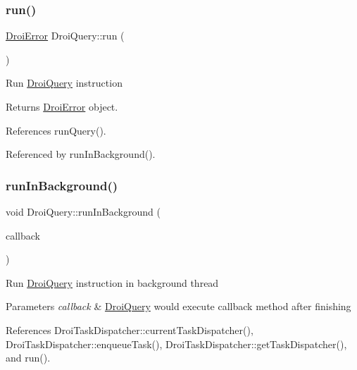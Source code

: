 \subsubsection{\texorpdfstring{run()}{run()}}
{\footnotesize\ttfamily \hyperlink{class_droi_error}{Droi\+Error} Droi\+Query\+::run (\begin{DoxyParamCaption}{ }\end{DoxyParamCaption})}

Run \hyperlink{class_droi_query}{Droi\+Query} instruction \begin{DoxyReturn}{Returns}
\hyperlink{class_droi_error}{Droi\+Error} object. 
\end{DoxyReturn}


References run\+Query().



Referenced by run\+In\+Background().

\mbox{\label{class_droi_query_a853e3dc36ab0918847a5279b0989c7ab}} 
\subsubsection{\texorpdfstring{run\+In\+Background()}{runInBackground()}}
{\footnotesize\ttfamily void Droi\+Query\+::run\+In\+Background (\begin{DoxyParamCaption}\item[{\hyperlink{struct_droi_callback}{Droi\+Callback}$<$ \hyperlink{class_droi_error}{Droi\+Error} $>$\+::on\+Callback}]{callback }\end{DoxyParamCaption})}

Run \hyperlink{class_droi_query}{Droi\+Query} instruction in background thread 
\begin{DoxyParams}{Parameters}
{\em callback} & \hyperlink{class_droi_query}{Droi\+Query} would execute callback method after finishing \\
\hline
\end{DoxyParams}


References Droi\+Task\+Dispatcher\+::current\+Task\+Dispatcher(), Droi\+Task\+Dispatcher\+::enqueue\+Task(), Droi\+Task\+Dispatcher\+::get\+Task\+Dispatcher(), and run().

\mbox{\label{class_droi_query_ac858282a8efa4e45a7cd06ea2f2c55cb}} 

